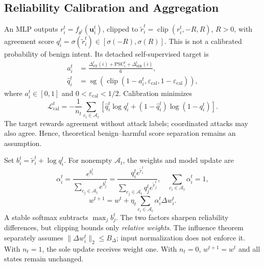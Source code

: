 \subsection{Reliability Calibration and Aggregation}
\label{subsec:method_weighting}

An MLP outputs $r_i^t=f_{\theta^t}(\mathbf u_i^t)$, clipped to $\widetilde r_i^t=\operatorname{clip}(r_i^t,-R,R)$, $R>0$, with agreement score $q_i^t=\sigma(\widetilde r_i^t)\in[\sigma(-R),\sigma(R)]$. This is not a calibrated probability of benign intent. Its detached self-supervised target is
\begin{equation}
\begin{aligned}
a_i^t&=\frac{\Delta_{\mathrm{ST}}^t(i)+\mathrm{PSC}_i^t+\Delta_{\mathrm{MR}}^t(i)}{6},\\
\widehat q_i^t&=\operatorname{sg}\!\left(\operatorname{clip}(1-a_i^t,\varepsilon_{\mathrm{cal}},1-\varepsilon_{\mathrm{cal}})\right),
\end{aligned}
\label{eq:method_calibration_target}
\end{equation}
where $a_i^t\in[0,1]$ and $0<\varepsilon_{\mathrm{cal}}<1/2$. Calibration minimizes
\begin{equation}
\mathcal L_{\mathrm{cal}}^t=-\frac1{n_t}\sum_{c_i\in\mathcal A_t}\left[\widehat q_i^t\log q_i^t+(1-\widehat q_i^t)\log(1-q_i^t)\right].
\label{eq:method_calibration_loss}
\end{equation}
The target rewards agreement without attack labels; coordinated attacks may also agree. Hence, theoretical benign--harmful score separation remains an assumption.

Set $b_i^t=\widetilde r_i^t+\log q_i^t$. For nonempty $\mathcal A_t$, the weights and model update are
\begin{equation}
\alpha_i^t=\frac{e^{b_i^t}}{\sum_{c_j\in\mathcal A_t}e^{b_j^t}}=\frac{q_i^te^{\widetilde r_i^t}}{\sum_{c_j\in\mathcal A_t}q_j^te^{\widetilde r_j^t}},\quad\sum_{c_i\in\mathcal A_t}\alpha_i^t=1,
\label{eq:interaction_aware_weight}
\end{equation}
\begin{equation}
w^{t+1}=w^t+\eta_t\sum_{c_i\in\mathcal A_t}\alpha_i^t\Delta w_i^t.
\label{eq:method_aggregation}
\end{equation}
A stable softmax subtracts $\max_j b_j^t$. The two factors sharpen reliability differences, but clipping bounds only \emph{relative weights}. The influence theorem separately assumes $\|\Delta w_i^t\|_2\leq B_\Delta$; input normalization does not enforce it. With $n_t=1$, the sole update receives weight one. With $n_t=0$, $w^{t+1}=w^t$ and all states remain unchanged.


